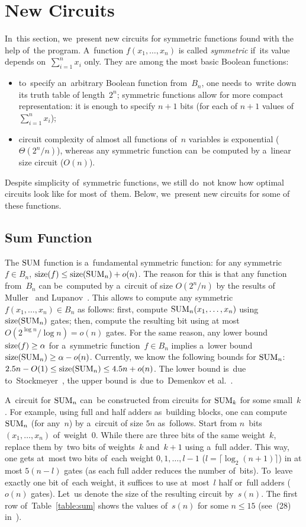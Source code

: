 \section{New Circuits}
In~this section, we~present new circuits for symmetric functions found with the help of~the program. A~function $f(x_1,\dotsc,x_n)$ is called \emph{symmetric} if~its value depends on~$\sum_{i=1}^nx_i$ only. They are among the most basic Boolean functions:
\begin{itemize}
\item to~specify an~arbitrary Boolean function
from~$B_n$, one needs
to~write down its truth table of length~$2^n$; symmetric functions allow for more compact representation: it is enough to specify $n+1$ bits (for each of $n+1$ values
of~$\sum_{i=1}^nx_i$);
\item circuit complexity of almost all functions
of~$n$ variables is exponential ($\Theta(2^n/n)$), whereas any symmetric function can~be computed by a~linear size circuit ($O(n)$).
\end{itemize}
Despite simplicity of~symmetric functions, we still do~not
know how optimal circuits look like for most of~them. Below, we~present new circuits for some of these functions.

\subsection{Sum Function}\label{section:sum}
The $\operatorname{SUM}$ function is a~fundamental symmetric function: for any symmetric $f \in B_n$, $\operatorname{size}(f)\le \operatorname{size}(\operatorname{SUM}_n)+o(n)$. The reason for this is that any function from~$B_n$ can be~computed by a~circuit of size $O(2^n/n)$ by the results of Muller~\cite{M56} and Lupanov~\cite{Lup59}. This allows to compute any symmetric $f(x_1, \dotsc, x_n) \in B_n$ as follows: first, compute $\operatorname{SUM}_n(x_1, \dotsc, x_n)$ using $\operatorname{size}(\operatorname{SUM}_n)$ gates; then, compute the resulting bit using at most $O(2^{\log n}/\log n)=o(n)$ gates. For the same reason, any lower bound $\operatorname{size}(f) \ge \alpha$ for
a~symmetric function~$f \in B_n$ implies a~lower bound $\operatorname{size}(\operatorname{SUM}_n) \ge \alpha-o(n)$. Currently, we know the following bounds for $\operatorname{SUM}_n$:
\(2.5n-O(1) \le \operatorname{size}(\operatorname{SUM}_n) \le 4.5n+o(n)\).
The lower bound is~due to~Stockmeyer~\cite{DBLP:journals/mst/Stockmeyer77}, the upper bound is~due to~Demenkov et al.~\cite{DBLP:journals/ipl/DemenkovKKY10}.

A~circuit for $\operatorname{SUM}_n$ can~be constructed from circuits for $\operatorname{SUM}_k$ for some small~$k$. For example,
using full and half adders as~building blocks, one can compute $\operatorname{SUM}_n$ (for any~$n$) by a~circuit of size $5n$ as~follows. Start from $n$~bits $(x_1, \dotsc, x_n)$ of~weight~$0$. While there are three bits of the same weight~$k$, replace them by~two bits of weights~$k$ and~$k+1$ using a~full adder. This way, one gets at~most two bits of~each weight $0,1,\dotsc,l-1$ ($l=\lceil \log_2(n+1)\rceil$) in at most $5(n-l)$ gates (as each full adder reduces the number of~bits). To~leave exactly one bit
of~each weight, it suffices to use at~most~$l$ half
or~full adders ($o(n)$ gates). Let~us denote the
size of the resulting circuit by~$s(n)$. The first row
of~Table~\ref{table:sum} shows the values of~$s(n)$ for
some $n \le 15$ (see~(28) in~\cite{Knuth:2008:ACP:1377542}).

